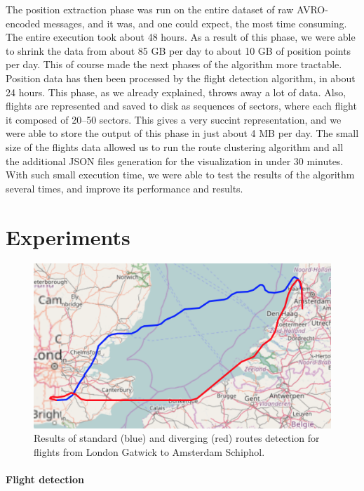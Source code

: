 \documentclass{vldb}
\begin{document}
The position extraction phase was run on the entire dataset of raw AVRO-encoded
messages, and it was, and one could expect, the most time consuming. The entire
execution took about 48 hours. As a result of this phase, we were able to shrink
the data from about 85 GB per day to about 10 GB of position points per day.
This of course made the next phases of the algorithm more tractable. Position
data has then been processed by the flight detection algorithm, in about 24
hours. This phase, as we already explained, throws away a lot of data. Also,
flights are represented and saved to disk as sequences of sectors, where each
flight it composed of 20--50 sectors. This gives a very succint representation,
and we were able to store the output of this phase in just about 4 MB per day.
The small size of the flights data allowed us to run the route clustering
algorithm and all the additional JSON files generation for the visualization in
under 30 minutes. With such small execution time, we were able to test the
results of the algorithm several times, and improve its performance and results.

\section{Experiments}

\begin{figure}[t]
  \centering
  \includegraphics[scale=0.4]{imgs/gatwick-schiphol.png}
  \caption{Results of standard (blue) and diverging (red) routes detection for
    flights from London Gatwick to Amsterdam Schiphol.}
  \label{fig:gatwick-schiphol}
\end{figure}

\paragraph{Flight detection}
\end{document}
